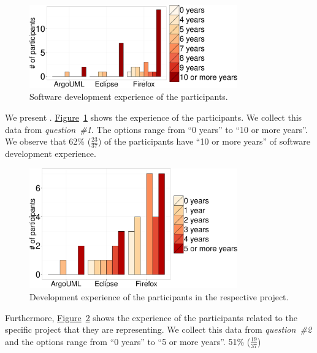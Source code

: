 \begin{figure}
	\centering
	\includegraphics[width=0.80\textwidth,keepaspectratio] 
	{chapters/chapter5/figures/demographic_experience.pdf}
	\caption{Software development experience of the participants.}
	\label{fig:demographics_experience}
\end{figure}
We present \DIFdelbegin {}\DIFdelend \DIFaddbegin {}\DIFaddend .
\hyperref[fig:demographics_experience]{Figure}~\ref{fig:demographics_experience}
shows the experience of the participants. We collect this data from {\em
question~\#1}. The options range from ``0 years'' to ``10 or more years''. We
observe that 62\% ($\frac{23}{37}$) of the participants have ``10 or more
years'' of software development experience. 
\begin{figure}
	\centering
	\includegraphics[width=0.80\textwidth,keepaspectratio] 
	{chapters/chapter5/figures/demographic_experience_project.pdf}
	\caption{Development experience of the participants in the
	respective project.}
	\label{fig:demographics_experience_project}
\end{figure}
Furthermore,
\hyperref[fig:demographics_experience_project]{Figure}~\ref{fig:demographics_experience_project}
shows the experience of the participants related to the specific project that
they are representing. We collect this data from {\em question~\#2} and the
options range from ``0 years'' to ``5 or more years''. 51\%  ($\frac{19}{37}$)
